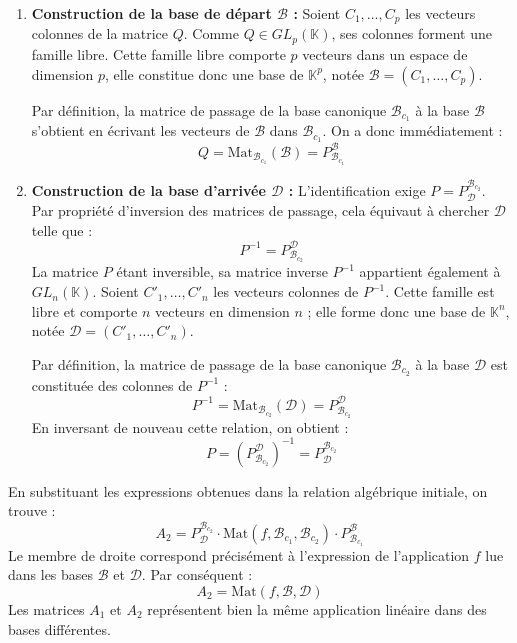 \documentclass[11pt, a4paper]{article}
\theoremstyle{definition}
\begin{document}
\begin{enumerate}
    \item \textbf{Construction de la base de départ $\mathcal{B}$ :}
    Soient $C_1, \dots, C_p$ les vecteurs colonnes de la matrice $Q$. Comme $Q \in GL_p(\mathbb{K})$, ses colonnes forment une famille libre. Cette famille libre comporte $p$ vecteurs dans un espace de dimension $p$, elle constitue donc une base de $\mathbb{K}^p$, notée $\mathcal{B} = (C_1, \dots, C_p)$.
    
    Par définition, la matrice de passage de la base canonique $\mathcal{B}_{c_1}$ à la base $\mathcal{B}$ s'obtient en écrivant les vecteurs de $\mathcal{B}$ dans $\mathcal{B}_{c_1}$. On a donc immédiatement :
    \[
    Q = \mathrm{Mat}_{\mathcal{B}_{c_1}}(\mathcal{B}) = P_{\mathcal{B}_{c_1}}^{\mathcal{B}}
    \]

    \item \textbf{Construction de la base d'arrivée $\mathcal{D}$ :}
    L'identification exige $P = P_{\mathcal{D}}^{\mathcal{B}_{c_2}}$. Par propriété d'inversion des matrices de passage, cela équivaut à chercher $\mathcal{D}$ telle que :
    \[
    P^{-1} = P_{\mathcal{B}_{c_2}}^{\mathcal{D}}
    \]
    La matrice $P$ étant inversible, sa matrice inverse $P^{-1}$ appartient également à $GL_n(\mathbb{K})$. Soient $C'_1, \dots, C'_n$ les vecteurs colonnes de $P^{-1}$. Cette famille est libre et comporte $n$ vecteurs en dimension $n$ ; elle forme donc une base de $\mathbb{K}^n$, notée $\mathcal{D} = (C'_1, \dots, C'_n)$.
    
    Par définition, la matrice de passage de la base canonique $\mathcal{B}_{c_2}$ à la base $\mathcal{D}$ est constituée des colonnes de $P^{-1}$ :
    \[
    P^{-1} = \mathrm{Mat}_{\mathcal{B}_{c_2}}(\mathcal{D}) = P_{\mathcal{B}_{c_2}}^{\mathcal{D}}
    \]
    En inversant de nouveau cette relation, on obtient :
    \[
    P = \left( P_{\mathcal{B}_{c_2}}^{\mathcal{D}} \right)^{-1} = P_{\mathcal{D}}^{\mathcal{B}_{c_2}}
    \]
\end{enumerate}

En substituant les expressions obtenues dans la relation algébrique initiale, on trouve :
\[
A_2 = P_{\mathcal{D}}^{\mathcal{B}_{c_2}} \cdot \mathrm{Mat}(f, \mathcal{B}_{c_1}, \mathcal{B}_{c_2}) \cdot P_{\mathcal{B}_{c_1}}^{\mathcal{B}}
\]
Le membre de droite correspond précisément à l'expression de l'application $f$ lue dans les bases $\mathcal{B}$ et $\mathcal{D}$. Par conséquent :
\[
A_2 = \mathrm{Mat}(f, \mathcal{B}, \mathcal{D})
\]
Les matrices $A_1$ et $A_2$ représentent bien la même application linéaire dans des bases différentes.
\end{document}
